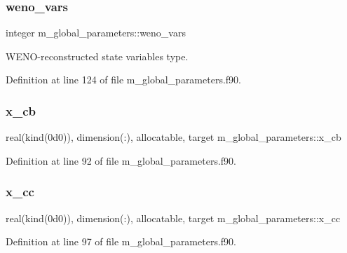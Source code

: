 \subsubsection{\texorpdfstring{weno\+\_\+vars}{weno\_vars}}
{\footnotesize\ttfamily integer m\+\_\+global\+\_\+parameters\+::weno\+\_\+vars}



W\+E\+N\+O-\/reconstructed state variables type. 



Definition at line 124 of file m\+\_\+global\+\_\+parameters.\+f90.

\mbox{\label{namespacem__global__parameters_a800c19cad11fe2774ac137b12ec89e33}} 
\subsubsection{\texorpdfstring{x\+\_\+cb}{x\_cb}}
{\footnotesize\ttfamily real(kind(0d0)), dimension(\+:), allocatable, target m\+\_\+global\+\_\+parameters\+::x\+\_\+cb}



Definition at line 92 of file m\+\_\+global\+\_\+parameters.\+f90.

\mbox{\label{namespacem__global__parameters_aea5b911d65b330f65e97052e9e8c0383}} 
\subsubsection{\texorpdfstring{x\+\_\+cc}{x\_cc}}
{\footnotesize\ttfamily real(kind(0d0)), dimension(\+:), allocatable, target m\+\_\+global\+\_\+parameters\+::x\+\_\+cc}



Definition at line 97 of file m\+\_\+global\+\_\+parameters.\+f90.

\mbox{\label{namespacem__global__parameters_a4bb8b661a170fc6ccd9fa3cc4b32c960}} 
